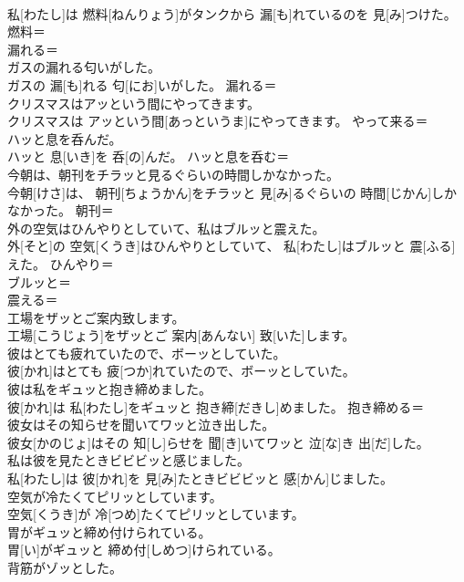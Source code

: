 \documentclass[8pt]{extreport}
\begin{document}
\begin{CJK}{UTF8}{min}
\\	私[わたし]は 燃料[ねんりょう]がタンクから 漏[も]れているのを 見[み]つけた。	燃料＝ 
\\	漏れる＝ 
\\	ガスの漏れる匂いがした。	
\\	ガスの 漏[も]れる 匂[にお]いがした。	漏れる＝ 
\\	クリスマスはアッという間にやってきます。	
\\	クリスマスは アッという間[あっというま]にやってきます。	やって来る＝ 
\\	ハッと息を呑んだ。	
\\	ハッと 息[いき]を 呑[の]んだ。	ハッと息を呑む＝ 
\\	今朝は、朝刊をチラッと見るぐらいの時間しかなかった。	
\\	今朝[けさ]は、 朝刊[ちょうかん]をチラッと 見[み]るぐらいの 時間[じかん]しかなかった。	朝刊＝ 
\\	外の空気はひんやりとしていて、私はブルッと震えた。	
\\	外[そと]の 空気[くうき]はひんやりとしていて、 私[わたし]はブルッと 震[ふる]えた。	ひんやり＝ 
\\	ブルッと＝ 
\\	震える＝ 
\\	工場をザッとご案内致します。	
\\	工場[こうじょう]をザッとご 案内[あんない] 致[いた]します。	
\\	彼はとても疲れていたので、ボーッとしていた。	
\\	彼[かれ]はとても 疲[つか]れていたので、ボーッとしていた。	
\\	彼は私をギュッと抱き締めました。	
\\	彼[かれ]は 私[わたし]をギュッと 抱き締[だきし]めました。	抱き締める＝ 
\\	彼女はその知らせを聞いてワッと泣き出した。	
\\	彼女[かのじょ]はその 知[し]らせを 聞[き]いてワッと 泣[な]き 出[だ]した。	
\\	私は彼を見たときビビビッと感じました。	
\\	私[わたし]は 彼[かれ]を 見[み]たときビビビッと 感[かん]じました。	
\\	空気が冷たくてピリッとしています。	
\\	空気[くうき]が 冷[つめ]たくてピリッとしています。	
\\	胃がギュッと締め付けられている。	
\\	胃[い]がギュッと 締め付[しめつ]けられている。	
\\	背筋がゾッとした。	

\end{CJK}
\end{document}
